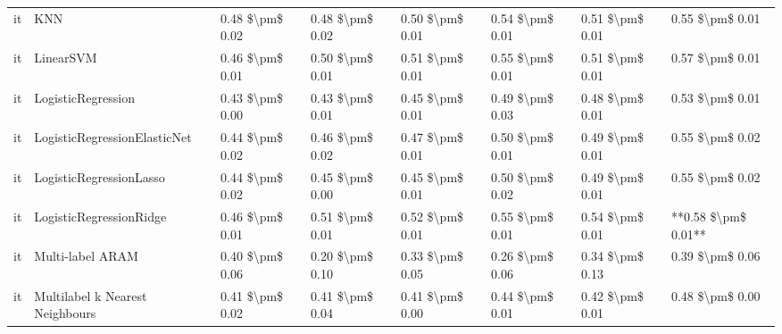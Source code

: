 \begin{tabular}{llllllll}
      it &                             KNN & 0.48 \$\textbackslash pm\$ 0.02 &           0.48 \$\textbackslash pm\$ 0.02 &       0.50 \$\textbackslash pm\$ 0.01 &        0.54 \$\textbackslash pm\$ 0.01 &                         0.51 \$\textbackslash pm\$ 0.01 &     0.55 \$\textbackslash pm\$ 0.01 \\
      it &                       LinearSVM & 0.46 \$\textbackslash pm\$ 0.01 &           0.50 \$\textbackslash pm\$ 0.01 &       0.51 \$\textbackslash pm\$ 0.01 &        0.55 \$\textbackslash pm\$ 0.01 &                         0.51 \$\textbackslash pm\$ 0.01 &     0.57 \$\textbackslash pm\$ 0.01 \\
      it &              LogisticRegression & 0.43 \$\textbackslash pm\$ 0.00 &           0.43 \$\textbackslash pm\$ 0.01 &       0.45 \$\textbackslash pm\$ 0.01 &        0.49 \$\textbackslash pm\$ 0.03 &                         0.48 \$\textbackslash pm\$ 0.01 &     0.53 \$\textbackslash pm\$ 0.01 \\
      it &    LogisticRegressionElasticNet & 0.44 \$\textbackslash pm\$ 0.02 &           0.46 \$\textbackslash pm\$ 0.02 &       0.47 \$\textbackslash pm\$ 0.01 &        0.50 \$\textbackslash pm\$ 0.01 &                         0.49 \$\textbackslash pm\$ 0.01 &     0.55 \$\textbackslash pm\$ 0.02 \\
      it &         LogisticRegressionLasso & 0.44 \$\textbackslash pm\$ 0.02 &           0.45 \$\textbackslash pm\$ 0.00 &       0.45 \$\textbackslash pm\$ 0.01 &        0.50 \$\textbackslash pm\$ 0.02 &                         0.49 \$\textbackslash pm\$ 0.01 &     0.55 \$\textbackslash pm\$ 0.02 \\
      it &         LogisticRegressionRidge & 0.46 \$\textbackslash pm\$ 0.01 &           0.51 \$\textbackslash pm\$ 0.01 &       0.52 \$\textbackslash pm\$ 0.01 &        0.55 \$\textbackslash pm\$ 0.01 &                         0.54 \$\textbackslash pm\$ 0.01 & **0.58 \$\textbackslash pm\$ 0.01** \\
      it &                Multi-label ARAM & 0.40 \$\textbackslash pm\$ 0.06 &           0.20 \$\textbackslash pm\$ 0.10 &       0.33 \$\textbackslash pm\$ 0.05 &        0.26 \$\textbackslash pm\$ 0.06 &                         0.34 \$\textbackslash pm\$ 0.13 &     0.39 \$\textbackslash pm\$ 0.06 \\
      it & Multilabel k Nearest Neighbours & 0.41 \$\textbackslash pm\$ 0.02 &           0.41 \$\textbackslash pm\$ 0.04 &       0.41 \$\textbackslash pm\$ 0.00 &        0.44 \$\textbackslash pm\$ 0.01 &                         0.42 \$\textbackslash pm\$ 0.01 &     0.48 \$\textbackslash pm\$ 0.00 \\

\end{tabular}
